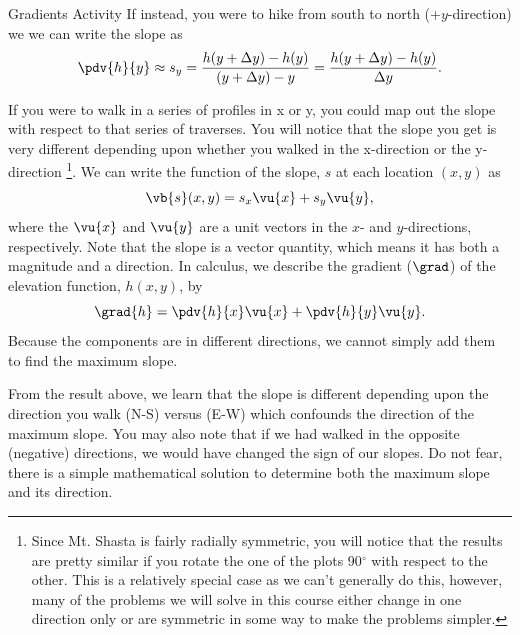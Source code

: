 \begin{activity}{Gradients Activity}
If instead, you were to hike from south to north (+$y$-direction) we we can write the slope as
\begin{equation}
    \pdv{h}{y} \approx s_y = 
        \frac{h(y + \Delta y) - h(y)}{(y + \Delta{y}) - y} =
        \frac{h(y + \Delta y) - h(y)}{\Delta y}.
\end{equation}

If you were to walk in a series of profiles in x or y, you could map out the slope with respect to that series of traverses.  You will notice that the slope you get is very different depending upon whether you walked in the x-direction or the y-direction
\footnote{Since Mt. Shasta is fairly radially symmetric, you will notice that the results are pretty similar if you rotate the one of the plots 90$^\circ$ with respect to the other.  This is a relatively special case as we can't generally do this, however, many of the problems we will solve in this course either change in one direction only or are symmetric in some way to make the problems simpler.}.  We can write the function of the slope, $s$ at each location $(x,y)$ as
\begin{equation}
    \vb{s}(x,y) = s_x \vu{x} + s_y \vu{y},
\end{equation}
where the $\vu{x}$ and $\vu{y}$ are a unit vectors in the $x$- and $y$-directions, respectively.  Note that the slope is a vector quantity, which means it has both a magnitude and a direction.  In calculus, we describe the gradient ($\grad$) of the elevation function, $h(x,y)$, by
\begin{equation}
    \grad{h} = \pdv{h}{x} \vu{x} + \pdv{h}{y} \vu{y} .
\end{equation}
Because the components are in different directions, we cannot simply add them to find the maximum slope.

From the result above, we learn that the slope is different depending upon the direction you walk (N-S) versus (E-W) which confounds the direction of the maximum slope.  You may also note that if we had walked in the opposite (negative) directions, we would have changed the sign of our slopes.  Do not fear, there is a simple mathematical solution to determine both the maximum slope and its direction.


\end{activity}
